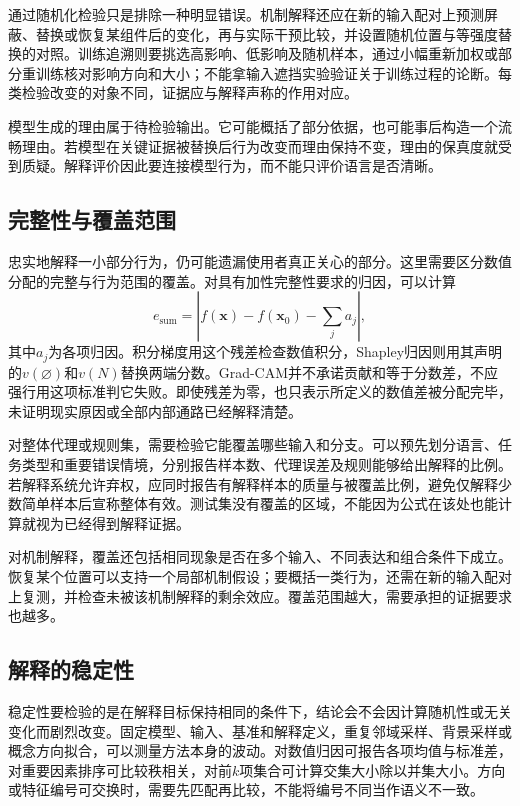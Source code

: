 通过随机化检验只是排除一种明显错误。机制解释还应在新的输入配对上预测屏蔽、替换或恢复某组件后的变化，再与实际干预比较，并设置随机位置与等强度替换的对照。训练追溯则要挑选高影响、低影响及随机样本，通过小幅重新加权或部分重训练核对影响方向和大小；不能拿输入遮挡实验验证关于训练过程的论断。每类检验改变的对象不同，证据应与解释声称的作用对应。

模型生成的理由属于待检验输出。它可能概括了部分依据，也可能事后构造一个流畅理由。若模型在关键证据被替换后行为改变而理由保持不变，理由的保真度就受到质疑。解释评价因此要连接模型行为，而不能只评价语言是否清晰。

\subsection{完整性与覆盖范围}
\label{sec:interpretability-quality-coverage}

忠实地解释一小部分行为，仍可能遗漏使用者真正关心的部分。这里需要区分数值分配的完整与行为范围的覆盖。对具有加性完整性要求的归因，可以计算
\[
 e_{\mathrm{sum}}
 =\left|f(\bm{x})-f(\bm{x}_0)-\sum_j a_j\right|,
\]
其中$a_j$为各项归因。积分梯度用这个残差检查数值积分，Shapley归因则用其声明的$v(\varnothing)$和$v(N)$替换两端分数。Grad-CAM并不承诺贡献和等于分数差，不应强行用这项标准判它失败。即使残差为零，也只表示所定义的数值差被分配完毕，未证明现实原因或全部内部通路已经解释清楚。

对整体代理或规则集，需要检验它能覆盖哪些输入和分支。可以预先划分语言、任务类型和重要错误情境，分别报告样本数、代理误差及规则能够给出解释的比例。若解释系统允许弃权，应同时报告有解释样本的质量与被覆盖比例，避免仅解释少数简单样本后宣称整体有效。测试集没有覆盖的区域，不能因为公式在该处也能计算就视为已经得到解释证据。

对机制解释，覆盖还包括相同现象是否在多个输入、不同表达和组合条件下成立。恢复某个位置可以支持一个局部机制假设；要概括一类行为，还需在新的输入配对上复测，并检查未被该机制解释的剩余效应。覆盖范围越大，需要承担的证据要求也越多。

\subsection{解释的稳定性}
\label{sec:interpretability-quality-stability}

稳定性要检验的是在解释目标保持相同的条件下，结论会不会因计算随机性或无关变化而剧烈改变。固定模型、输入、基准和解释定义，重复邻域采样、背景采样或概念方向拟合，可以测量方法本身的波动。对数值归因可报告各项均值与标准差，对重要因素排序可比较秩相关，对前$k$项集合可计算交集大小除以并集大小。方向或特征编号可交换时，需要先匹配再比较，不能将编号不同当作语义不一致。

